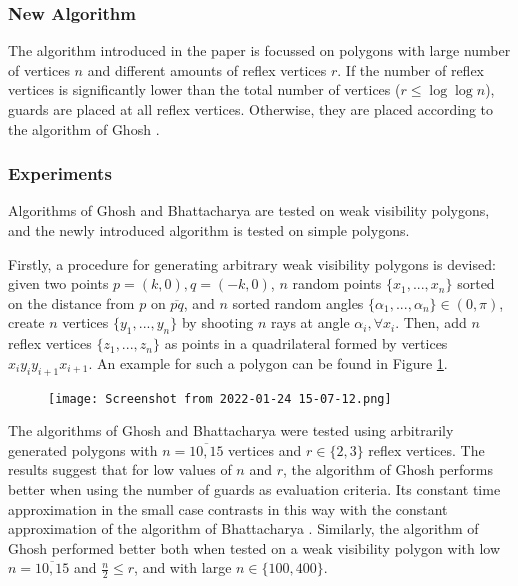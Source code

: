 \subsubsection{New Algorithm}
The algorithm introduced in the paper is focussed on polygons with large number of vertices $n$ and different amounts of reflex vertices $r$. If the number of reflex vertices is significantly lower than the total number of vertices ($r \leq \log \log n$), guards are placed at all reflex vertices. Otherwise, they are placed according to the algorithm of Ghosh \cite{GHOSH2010718}.

\subsubsection{Experiments}
Algorithms of Ghosh \cite{GHOSH2010718} and Bhattacharya \cite{bhattacharya2016approximability} are tested on weak visibility polygons, and the newly introduced algorithm is tested on simple polygons. 

Firstly, a procedure for generating arbitrary weak visibility polygons is devised: given two points $p = (k, 0), q = (-k, 0)$,  $n$ random points $\{x_1, ..., x_n\}$ sorted on the distance from $p$ on $\overline{pq}$, and $n$ sorted random angles $\{\alpha_1, ..., \alpha_n\} \in  (0, \pi)$, create $n$ vertices $\{y_1, ..., y_n\}$ by shooting $n$ rays at angle $\alpha_i, \forall x_i$. Then, add $n$ reflex vertices $\{z_1, ..., z_n\}$ as points in a quadrilateral formed by vertices $x_iy_iy_{i + 1}x_{i + 1}$. An example for such a polygon can be found in Figure \ref{fig:weak}.

\begin{figure}[h!]
    \centering
    \texttt{[image: Screenshot from 2022-01-24 15-07-12.png]}
    \caption{}
    \label{fig:weak}
\end{figure}

The algorithms of Ghosh \cite{GHOSH2010718} and Bhattacharya \cite{bhattacharya2016approximability} were tested using arbitrarily generated polygons with $n = \overline{10, 15}$ vertices and $r \in \{2, 3\}$ reflex vertices. The results suggest that for low values of $n$ and $r$, the algorithm of Ghosh \cite{GHOSH2010718} performs better when using the number of guards as evaluation criteria. Its constant time approximation in the small case contrasts in this way with the constant approximation of the algorithm of Bhattacharya \cite{bhattacharya2016approximability}. Similarly, the algorithm of Ghosh \cite{GHOSH2010718} performed better both when tested on a weak visibility polygon with low $n = \overline{10, 15}$ and $\frac n 2 \leq r$, and with large $n \in \{100, 400\}$.

